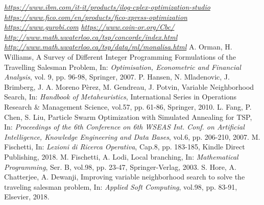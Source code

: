 \begin{thebibliography}{10}
 \emph{\url{https://www.ibm.com/it-it/products/ilog-cplex-optimization-studio}}
 \emph{\url{https://www.fico.com/en/products/fico-xpress-optimization}}
 \emph{\url{https://www.gurobi.com}}
 \emph{\url{https://www.coin-or.org/Cbc/}}
 \emph{\url{http://www.math.uwaterloo.ca/tsp/concorde/index.html}}
 \emph{\url{http://www.math.uwaterloo.ca/tsp/data/ml/monalisa.html}}
 A. Orman, H. Williams, A Survey of Different Integer Programming Formulations of the Travelling Salesman Problem, In: \emph{Optimisation, Econometric and Financial Analysis}, vol. 9, pp. 96-98, Springer, 2007.
 P. Hansen, N. Mladenovic, J. Brimberg, J. A. Moreno Pèrez, M. Gendreau, J. Potvin, Variable Neighborhood Search, In: \emph{Handbook of Metaheuristics}, International Series in Operations Research \& Management Science, vol.57, pp. 61-86, Springer, 2010.
 L. Fang, P. Chen, S. Liu, Particle Swarm Optimization with Simulated Annealing for TSP, In: \emph {Proceedings of the 6th Conference on 6th WSEAS Int. Conf. on Artificial Intelligence, Knowledge Engineering and Data Bases}, vol.6, pp. 206-210, 2007.
 M. Fischetti, In: \emph {Lezioni di Ricerca Operativa}, Cap.8, pp. 183-185, Kindle Direct Publishing, 2018.
 M. Fischetti, A. Lodi, Local branching, In: \emph {Mathematical Programming}, Ser. B, vol.98, pp. 23-47, Springer-Verlag, 2003.
 S. Hore, A. Chatterjee, A. Dewanji, Improving variable neighborhood search to solve the traveling salesman problem, In: \emph {Applied Soft Computing}, vol.98, pp. 83-91, Elsevier, 2018.
\end{thebibliography}